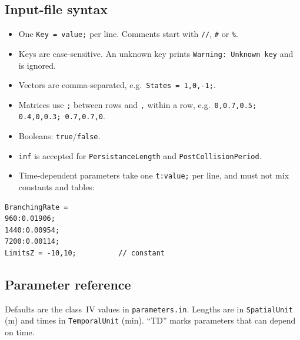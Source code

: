 \documentclass[11pt,a4paper]{article}
\newcommand{\code}[1]{\texttt{#1}}
\begin{document}
\subsection{Input-file syntax}
\begin{itemize}
  \item One \code{Key = value;} per line. Comments start with \code{//}, \code{\#} or \code{\%}.
  \item Keys are case-sensitive. An unknown key prints \code{Warning: Unknown key} and is ignored.
  \item Vectors are comma-separated, e.g.\ \code{States = 1,0,-1;}.
  \item Matrices use \code{;} between rows and \code{,} within a row, e.g.\ \code{0,0.7,0.5; 0.4,0,0.3; 0.7,0.7,0}.
  \item Booleans: \code{true}/\code{false}.
  \item \code{inf} is accepted for \code{PersistanceLength} and \code{PostCollisionPeriod}.
  \item Time-dependent parameters take one \code{t:value;} per line, and must not mix constants and tables:
\end{itemize}
\begin{lstlisting}
BranchingRate =
960:0.01906;
1440:0.00954;
7200:0.00114;
LimitsZ = -10,10;          // constant
\end{lstlisting}

\subsection{Parameter reference}
Defaults are the class~IV values in \code{parameters.in}. Lengths are in \code{SpatialUnit} (\textmu m) and times in \code{TemporalUnit} (min). ``TD'' marks parameters that can depend on time.
\end{document}
